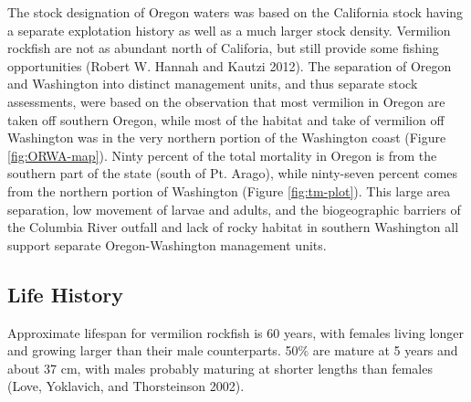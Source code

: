 \documentclass[11pt,
  english,
  a4paper,
]{article}
\begin{document}

The stock designation of Oregon waters was based on the California stock having a separate explotation history as well as a much larger stock density. Vermilion rockfish are not as abundant north of Califoria, but still provide some fishing opportunities {(Robert W. Hannah and Kautzi 2012)\leavevmode\tagmcend\tagstructend}. The separation of Oregon and Washington into distinct management units, and thus separate stock assessments, were based on the observation that most vermilion in Oregon are taken off southern Oregon, while most of the habitat and take of vermilion off Washington was in the very northern portion of the Washington coast (Figure \ref{fig:ORWA-map}). Ninty percent of the total mortality in Oregon is from the southern part of the state (south of Pt. Arago), while ninty-seven percent comes from the northern portion of Washington (Figure \ref{fig:tm-plot}). This large area separation, low movement of larvae and adults, and the biogeographic barriers of the Columbia River outfall and lack of rocky habitat in southern Washington all support separate Oregon-Washington management units.

\leavevmode\tagmcend\tagstructend\par


\hypertarget{life-history}{%
\subsection{Life History}\label{life-history}}

\leavevmode\tagmcend\tagstructend


Approximate lifespan for vermilion rockfish is 60 years, with females living longer and growing larger than their male counterparts. 50\% are mature at 5 years and about 37 cm, with males probably maturing at shorter lengths than females {(Love, Yoklavich, and Thorsteinson 2002)\leavevmode\tagmcend\tagstructend}.

\leavevmode\tagmcend\tagstructend\par

\end{document}
